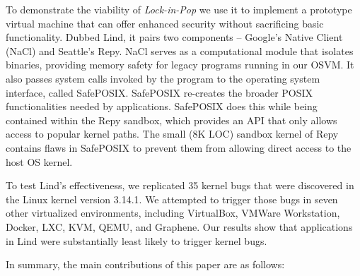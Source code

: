 
To demonstrate the viability of \emph{Lock-in-Pop} we use it to implement a 
prototype virtual machine that can offer enhanced security without sacrificing
 basic functionality. Dubbed Lind, it pairs two components -- Google's Native Client
(NaCl) and Seattle's Repy. NaCl serves as a computational module that isolates
binaries, providing memory
safety for legacy programs running in our OSVM. It also passes system calls
invoked by the program to the operating system interface, called SafePOSIX. 
SafePOSIX re-creates the broader POSIX functionalities needed by applications.
SafePOSIX does this while being contained within the Repy sandbox, which
provides an API that only allows access to popular kernel paths.  The small 
(8K LOC) sandbox kernel of Repy contains flaws in SafePOSIX 
to prevent them from allowing direct access to the host OS kernel.


To test Lind's effectiveness, we replicated 35 kernel bugs that were
discovered in the Linux kernel version 3.14.1.  We attempted to trigger those
bugs in seven other virtualized environments,
including VirtualBox, VMWare Workstation, Docker, LXC, KVM, QEMU, and Graphene.
Our results show that applications in Lind were substantially least likely to trigger 
kernel bugs. 


In summary, the main contributions of this paper are as follows:


